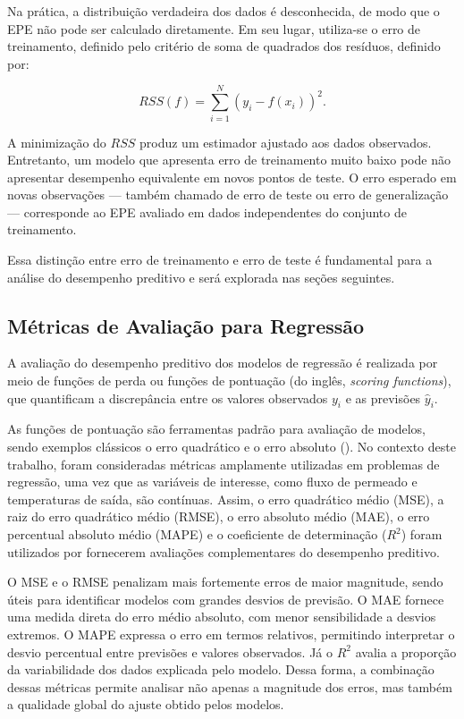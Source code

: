 Na prática, a distribuição verdadeira dos dados é desconhecida, de modo que o EPE não pode ser calculado diretamente. Em seu lugar, utiliza-se o erro de treinamento, definido pelo critério de soma de quadrados dos resíduos, definido por:

\begin{equation}
RSS(f) = \sum_{i=1}^{N} (y_i - f(x_i))^2.
\end{equation}

A minimização do $RSS$ produz um estimador ajustado aos dados observados. Entretanto, um modelo que apresenta erro de treinamento muito baixo pode não apresentar desempenho equivalente em novos pontos de teste. O erro esperado em novas observações — também chamado de erro de teste ou erro de generalização — corresponde ao EPE avaliado em dados independentes do conjunto de treinamento.

Essa distinção entre erro de treinamento e erro de teste é fundamental para a análise do desempenho preditivo e será explorada nas seções seguintes.

\subsection{Métricas de Avaliação para Regressão}

A avaliação do desempenho preditivo dos modelos de regressão é realizada por meio de funções de perda ou funções de pontuação (do inglês, \textit{scoring functions}), que quantificam a discrepância entre os valores observados $y_i$ e as previsões $\hat{y}_i$. 

As funções de pontuação são ferramentas padrão para avaliação de modelos, sendo exemplos clássicos o erro quadrático e o erro absoluto (\cite{Fissler2022ModelComparison}). No contexto deste trabalho, foram consideradas métricas amplamente utilizadas em problemas de regressão, uma vez que as variáveis de interesse, como fluxo de permeado e temperaturas de saída, são contínuas. Assim, o erro quadrático médio (MSE), a raiz do erro quadrático médio (RMSE), o erro absoluto médio (MAE), o erro percentual absoluto médio (MAPE) e o coeficiente de determinação (\(R^2\)) foram utilizados por fornecerem avaliações complementares do desempenho preditivo.

O MSE e o RMSE penalizam mais fortemente erros de maior magnitude, sendo úteis para identificar modelos com grandes desvios de previsão. O MAE fornece uma medida direta do erro médio absoluto, com menor sensibilidade a desvios extremos. O MAPE expressa o erro em termos relativos, permitindo interpretar o desvio percentual entre previsões e valores observados. Já o \(R^2\) avalia a proporção da variabilidade dos dados explicada pelo modelo. Dessa forma, a combinação dessas métricas permite analisar não apenas a magnitude dos erros, mas também a qualidade global do ajuste obtido pelos modelos.

